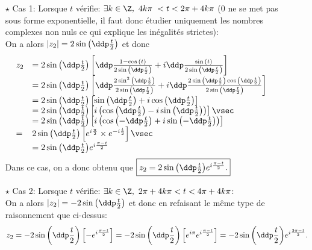 \begin{correction}
\begin{itemize}
\begin{itemize}
\item[$\star$] Cas 1: Lorsque $t$ v\'erifie: $\exists k\in\Z,\ 4k\pi\ < t  < 2\pi+4k\pi$ (0 ne se met pas sous forme exponentielle, il faut donc \'etudier uniquement les nombres complexes non nuls ce qui explique les in\'egalit\'es strictes):\\
\noindent On a alors $|z_2|=2\sin{\left( \ddp\frac{t}{2} \right)}$ et donc 
$$\begin{array}{lllll}
z_2&=2\sin{\left( \ddp\frac{t}{2} \right)} \left\lbrack   \ddp\frac{1-\cos{(t)}}{2\sin{\left( \ddp\frac{t}{2} \right)}}+i\ddp\frac{\sin{(t)}}{2\sin{\left( \ddp\frac{t}{2} \right)}}  \right\rbrack\\ &=2\sin{\left( \ddp\frac{t}{2} \right)} \left\lbrack 
\ddp\frac{  2\sin^2{\left( \ddp\frac{t}{2} \right)}   }{2\sin{\left( \ddp\frac{t}{2} \right)}}+i\ddp\frac{  2\sin{\left( \ddp\frac{t}{2} \right)}\cos{\left( \ddp\frac{t}{2} \right)} }{2\sin{\left( \ddp\frac{t}{2} \right)}}
   \right\rbrack\\
   &= 2\sin{\left( \ddp\frac{t}{2} \right)} \left\lbrack \sin{\left( \ddp\frac{t}{2} \right)} +i\cos{\left( \ddp\frac{t}{2} \right)}    \right\rbrack\\
   & =2\sin{\left( \ddp\frac{t}{2} \right)} \left\lbrack i\left( \cos{\left( \ddp\frac{t}{2} \right)} -i \sin{\left( \ddp\frac{t}{2} \right)}   \right)\right\rbrack\vsec\\
   &= 2\sin{\left( \ddp\frac{t}{2} \right)} \left\lbrack i\left( \cos{\left( -\ddp\frac{t}{2} \right)} +i \sin{\left( -\ddp\frac{t}{2} \right)}  \right) \right\rbrack \\
    = &2\sin{\left( \ddp\frac{t}{2} \right)} \left\lbrack e^{i\frac{\pi}{2}} \times e^{-i\frac{t}{2}} \right\rbrack\vsec\\
   &= 2\sin{\left( \ddp\frac{t}{2} \right)}  e^{i\frac{\pi-t}{2}} &&
   \end{array}$$
Dans ce cas, on a donc obtenu que $\fbox{$z_2=2\sin{\left( \ddp\frac{t}{2} \right)}  e^{i\frac{\pi-t}{2}}.$}$   
\item[$\star$] Cas 2: Lorsque $t$ v\'erifie: $ \exists k\in\Z,\ 2\pi+4k\pi < t  < 4\pi+4k\pi$:\\
\noindent On a alors $|z_2|=-2\sin{\left( \ddp\frac{t}{2} \right)}$ et donc en refaisant le m\^{e}me type de raisonnement que ci-dessus:
$$
z_2=-2\sin{\left( \ddp\frac{t}{2} \right)}\left\lbrack  - e^{i\frac{\pi-t}{2}} \right\rbrack=-2\sin{\left( \ddp\frac{t}{2} \right)}\left\lbrack  e^{i\pi}e^{i\frac{\pi-t}{2}} \right\rbrack=-2\sin{\left( \ddp\frac{t}{2} \right)} e^{i\frac{3\pi-t}{2}}.$$

\end{itemize}
\end{itemize}
\end{correction}
